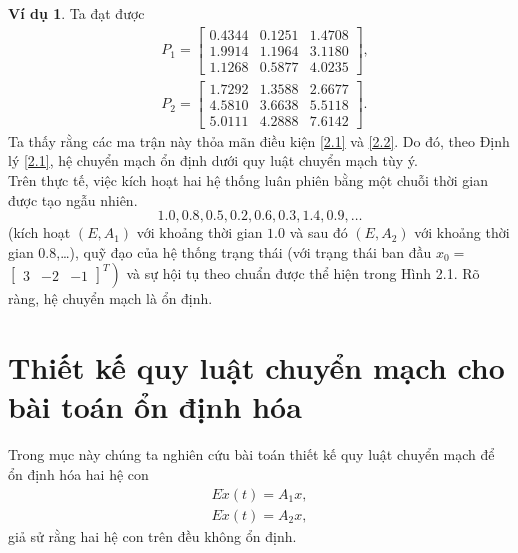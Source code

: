 \documentclass[12pt,a4paper]{report}
\theoremstyle{definition}
\newtheorem{vd}{Ví dụ}
\theoremstyle{definition}
\numberwithin{dl}{chapter}
\numberwithin{vd}{chapter}
\numberwithin{corollary}{chapter}
\numberwithin{lemma}{chapter}
\numberwithin{md}{chapter}
\numberwithin{dn}{chapter}
\numberwithin{cy}{chapter}
\numberwithin{nx}{chapter}
\begin{document}
\begin{vd}
Ta đạt được
\begin{equation}\label{2.64}
\begin{aligned}
&P_{1}=\left[\begin{array}{rrr}
0.4344 & 0.1251 & 1.4708 \\
1.9914 & 1.1964 & 3.1180 \\
1.1268 & 0.5877 & 4.0235
\end{array}\right], \\ 
&P_{2}=\left[\begin{array}{rrr} 
1.7292 & 1.3588 & 2.6677 \\ 
4.5810 & 3.6638 & 5.5118 \\ 
5.0111 & 4.2888 & 7.6142
\end{array}\right].
\end{aligned}
\end{equation}
Ta thấy rằng các ma trận này thỏa mãn điều kiện \eqref{2.1} và \eqref{2.2}. Do đó, theo Định lý \ref{2.1}, hệ chuyển mạch ổn định dưới quy luật chuyển mạch tùy ý. \\
Trên thực tế, việc kích hoạt hai hệ thống luân phiên bằng một chuỗi thời gian được tạo ngẫu nhiên.\\
\begin{equation}\label{2.65}
1.0, 0.8, 0.5, 0.2, 0.6, 0.3, 1.4, 0.9, \ldots  
\end{equation}
(kích hoạt $\left(E, A_{1}\right)$ với khoảng thời gian $1.0$ và sau đó $\left(E, A_{2}\right)$ với khoảng thời gian $0.8$,\ldots ), quỹ đạo của hệ thống trạng thái (với trạng thái ban đầu $x_{0}=$ $\left.\left[\begin{array}{lll}3 & -2 & -1\end{array}\right]^{T}\right)$ và sự hội tụ theo chuẩn được thể hiện trong Hình 2.1. Rõ ràng, hệ chuyển mạch là ổn định.
\end{vd}
\section{Thiết kế quy luật chuyển mạch cho bài toán ổn định hóa}
Trong mục này chúng ta nghiên cứu bài toán thiết kế quy luật chuyển mạch để ổn định hóa hai hệ con
\begin{equation}\label{2}
  \begin{aligned}
  E \dot{x}(t)=A_{1} x, \\
   E \dot{x}(t)=A_{2} x, 
   \end{aligned}
\end{equation}
giả sử rằng hai hệ con trên đều không ổn định. 
\end{document}

